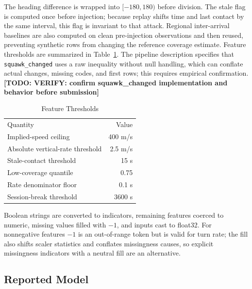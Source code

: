 \documentclass[conference]{IEEEtran}
\newcommand{\todo}[1]{\textbf{[TODO: #1]}}
\begin{document}
The heading difference is wrapped into $[-180,180)$ before division. The stale flag is computed once before injection; because replay shifts time and last contact by the same interval, this flag is invariant to that attack. Regional inter-arrival baselines are also computed on clean pre-injection observations and then reused, preventing synthetic rows from changing the reference coverage estimate. Feature thresholds are summarized in Table~\ref{tab:thresholds}. The pipeline description specifies that \texttt{squawk\_changed} uses a raw inequality without null handling, which can conflate actual changes, missing codes, and first rows; this requires empirical confirmation. \todo{VERIFY: confirm squawk\_changed implementation and behavior before submission}

\begin{table}[t]\caption{Feature Thresholds}\label{tab:thresholds}\centering\footnotesize

\begin{tabular}{lr}\toprule Quantity & Value \\

Implied-speed ceiling & 400 m/s \\

Absolute vertical-rate threshold & 2.5 m/s \\

Stale-contact threshold & 15 s \\

Low-coverage quantile & 0.75 \\

Rate denominator floor & 0.1 s \\

Session-break threshold & 3600 s \\

\bottomrule\end{tabular}\end{table}



Boolean strings are converted to indicators, remaining features coerced to numeric, missing values filled with $-1$, and inputs cast to float32. For nonnegative features $-1$ is an out-of-range token but is valid for turn rate; the fill also shifts scaler statistics and conflates missingness causes, so explicit missingness indicators with a neutral fill are an alternative.



\subsection{Reported Model}
\end{document}
